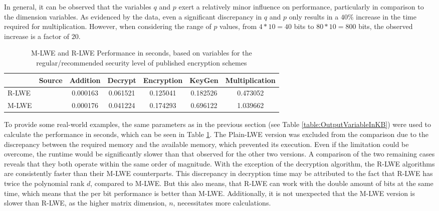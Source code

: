 In general, it can be observed that the variables $q$ and $p$ exert a relatively minor influence on performance, particularly in comparison to the dimension variables. As evidenced by the data, even a significant discrepancy in $q$ and $p$ only results in a $40\%$ increase in the time required for multiplication. However, when considering the range of $p$ values, from $4*10=40$ bits to $80*10=800$ bits, the observed increase is a factor of $20$.


\begin{table}[h]
  \centering
  \caption{M-LWE and R-LWE Performance in seconds, based on variables for the regular/recommended security level of published encryption schemes}
  \begin{tabular}{|l|c||c|c|c|c|c|}
    \toprule
          & Source                      & Addition & Decrypt  & Encryption & KeyGen   & Multiplication \\
    \midrule
    R-LWE & \cite{PracticalKeyExchange} & 0.000163 & 0.061521 & 0.125041   & 0.182526 & 0.473052       \\
    M-LWE & \cite{CyrstalsKyber}        & 0.000176 & 0.041224 & 0.174293   & 0.696122 & 1.039662       \\
    \bottomrule
  \end{tabular}
  \label{table:performanceComparison}
\end{table}

To provide some real-world examples, the same parameters as in the previous section (see Table \ref{table:OutputVariableInKB}) were used to calculate the performance in seconds, which can be seen in Table \ref{table:performanceComparison}. The Plain-LWE version was excluded from the comparison due to the discrepancy between the required memory and the available memory, which prevented its execution. Even if the limitation could be overcome, the runtime would be significantly slower than that observed for the other two versions. A comparison of the two remaining cases reveals that they both operate within the same order of magnitude. With the exception of the decryption algorithm, the R-LWE algorithms are consistently faster than their M-LWE counterparts. This discrepancy in decryption time may be attributed to the fact that R-LWE has twice the polynomial rank $d$, compared to M-LWE. But this also means, that R-LWE can work with the double amount of bits at the same time, which means that the per bit performance is better than M-LWE. Additionally, it is not unexpected that the M-LWE version is slower than R-LWE, as the higher matrix dimension, $n$, necessitates more calculations.


